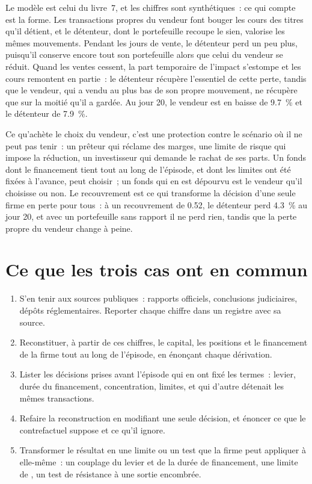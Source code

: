 Le modèle est celui du livre~7, et les chiffres sont synthétiques~: ce qui compte est la forme. Les transactions propres du vendeur font bouger les cours des titres qu'il détient, et
le détenteur, dont le portefeuille recoupe le sien, valorise les mêmes mouvements. Pendant les jours de vente, le détenteur perd un peu plus, puisqu'il conserve encore tout
son portefeuille alors que celui du vendeur se réduit. Quand les ventes cessent, la part temporaire de l'impact s'estompe et les cours remontent en partie~: le détenteur récupère
l'essentiel de cette perte, tandis que le vendeur, qui a vendu au plus bas de son propre mouvement, ne récupère que sur la moitié qu'il a gardée. Au jour 20, le vendeur est en baisse de 9.7~\% et le
détenteur de 7.9~\%.

Ce qu'achète le choix du vendeur, c'est une protection contre le scénario où il ne peut pas tenir~: un prêteur qui réclame des marges, une limite de risque qui impose la réduction, un
investisseur qui demande le rachat de ses parts. Un fonds dont le financement tient tout au long de l'épisode, et dont les limites ont été fixées à l'avance, peut choisir~; un fonds qui en est dépourvu est le vendeur
qu'il choisisse ou non. Le recouvrement est ce qui transforme la décision d'une seule firme en perte pour tous~: à un recouvrement de 0.52, le détenteur perd 4.3~\% au jour 20,
et avec un portefeuille sans rapport il ne perd rien, tandis que la perte propre du vendeur change à peine.

\section{Ce que les trois cas ont en commun}

\begin{method}\label{met:fm:case-studies-i:read}
\begin{enumerate}
\item S'en tenir aux sources publiques~: rapports officiels, conclusions judiciaires, dépôts réglementaires. Reporter chaque chiffre dans un registre avec sa source.
\item Reconstituer, à partir de ces chiffres, le capital, les positions et le financement de la firme tout au long de l'épisode, en énonçant chaque dérivation.
\item Lister les décisions prises avant l'épisode qui en ont fixé les termes~: levier, durée du financement, concentration, limites, et qui d'autre détenait les mêmes transactions.
\item Refaire la reconstruction en modifiant une seule décision, et énoncer ce que le contrefactuel suppose et ce qu'il ignore.
\item Transformer le résultat en une limite ou un test que la firme peut appliquer à elle-même~: un couplage du levier et de la durée de financement, une limite de , un
test de résistance à une sortie encombrée.
\end{enumerate}
\end{method}

